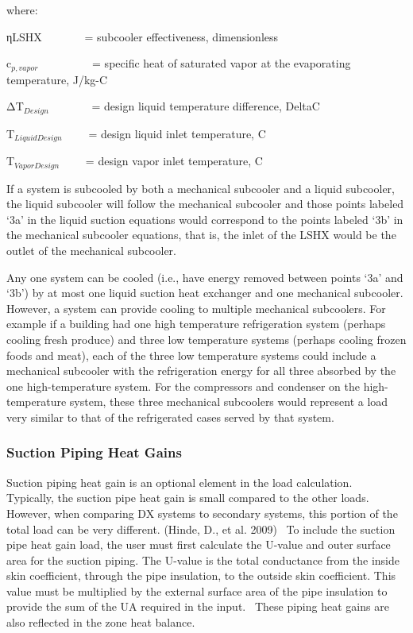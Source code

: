 where:

ηLSHX~~~~~~~ = subcooler effectiveness, dimensionless

c\(_{p,vapor}\)~~~~~~~~~ = specific heat of saturated vapor at the evaporating temperature, J/kg-C

ΔT\(_{Design}\)~~~~~~~ = design liquid temperature difference, DeltaC

T\(_{LiquidDesign}\)~~~~ = design liquid inlet temperature, C

T\(_{VaporDesign}\)~~~~ = design vapor inlet temperature, C

If a system is subcooled by both a mechanical subcooler and a liquid subcooler, the liquid subcooler will follow the mechanical subcooler and those points labeled `3a' in the liquid suction equations would correspond to the points labeled `3b' in the mechanical subcooler equations, that is, the inlet of the LSHX would be the outlet of the mechanical subcooler.

Any one system can be cooled (i.e., have energy removed between points `3a' and `3b') by at most one liquid suction heat exchanger and one mechanical subcooler. However, a system can provide cooling to multiple mechanical subcoolers. For example if a building had one high temperature refrigeration system (perhaps cooling fresh produce) and three low temperature systems (perhaps cooling frozen foods and meat), each of the three low temperature systems could include a mechanical subcooler with the refrigeration energy for all three absorbed by the one high-temperature system. For the compressors and condenser on the high-temperature system, these three mechanical subcoolers would represent a load very similar to that of the refrigerated cases served by that system.

\subsubsection{Suction Piping Heat Gains}\label{suction-piping-heat-gains}

Suction piping heat gain is an optional element in the load calculation.~ Typically, the suction pipe heat gain is small compared to the other loads.~ However, when comparing DX systems to secondary systems, this portion of the total load can be very different. (Hinde, D., et al. 2009) ~To include the suction pipe heat gain load, the user must first calculate the U-value and outer surface area for the suction piping. The U-value is the total conductance from the inside skin coefficient, through the pipe insulation, to the outside skin coefficient. This value must be multiplied by the external surface area of the pipe insulation to provide the sum of the UA required in the input.~ These piping heat gains are also reflected in the zone heat balance.

